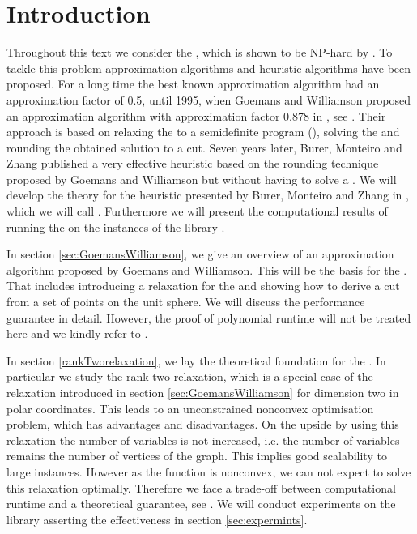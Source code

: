 \documentclass[12pt,a4paper]{article}
\theoremstyle{mythm}
\begin{document}
\tableofcontents

\section{Introduction} 
Throughout this text we consider the \mcp, which is shown to be NP-hard by \cite{Garey1974}.
To tackle this problem approximation algorithms and heuristic algorithms have been proposed.
For a long time the best known approximation algorithm had an approximation factor of 0.5, until 1995, when Goemans and Williamson proposed an approximation
algorithm with approximation factor 0.878 in \cite{GoemansWilliamson1995}, see \cite[p. 420]{Korte2018}.
Their approach is based on relaxing the \mcp to a semidefinite program (\SDP), solving the \SDP and rounding the obtained solution to a cut.
Seven years later, Burer, Monteiro and Zhang published a very effective heuristic based on the rounding technique proposed by Goemans and Williamson but without having to
solve a \SDP.
We will develop the theory for the heuristic presented by Burer, Monteiro and Zhang in \cite{Burer2002}, which we will call \BH. 
Furthermore we will present the computational results of running the \BH on the instances of the library \cite{MallachLibrary}.

In section \ref{sec:GoemansWilliamson}, we give an overview of an approximation algorithm proposed by Goemans and Williamson. 
This will be the basis for the \BH.
That includes introducing a \sdp relaxation for the \mcp and showing how to derive a cut from a set of points on the unit sphere.
We will discuss the performance guarantee in detail. 
However, the proof of polynomial runtime will not be treated here and we kindly refer to \cite{Korte2018}.

In section \ref{rankTworelaxation}, we lay the theoretical foundation for the \BH. %
In particular we study the rank-two relaxation, which is a special case of the \SDP relaxation introduced in section \ref{sec:GoemansWilliamson} for dimension two in polar coordinates.
This leads to an unconstrained nonconvex optimisation problem, which has advantages and disadvantages.
On the upside by using this relaxation the number of variables is not increased, 
i.e. the number of variables remains the number of vertices of the graph.
This implies good scalability to large instances.
However as the function is nonconvex, we can not expect to solve this relaxation optimally.
Therefore we face a trade-off between computational runtime and a theoretical guarantee, see \cite[p. 506]{Burer2002}.
We will conduct experiments on the library \cite{MallachLibrary} asserting the effectiveness in section \ref{sec:expermints}. %
\end{document}

